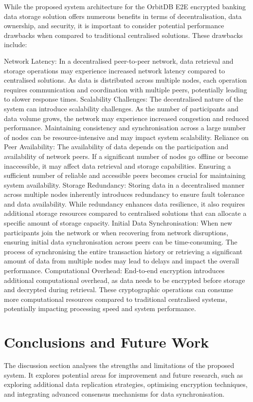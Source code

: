 \documentclass[a4paper,11 pt]{article}
\theoremstyle{definition}
\begin{document}
While the proposed system architecture for the OrbitDB E2E encrypted banking data storage solution offers numerous benefits in terms of decentralisation, data ownership, and security, it is important to consider potential performance drawbacks when compared to traditional centralised solutions. These drawbacks include:

Network Latency: In a decentralised peer-to-peer network, data retrieval and storage operations may experience increased network latency compared to centralised solutions. As data is distributed across multiple nodes, each operation requires communication and coordination with multiple peers, potentially leading to slower response times.
Scalability Challenges: The decentralised nature of the system can introduce scalability challenges. As the number of participants and data volume grows, the network may experience increased congestion and reduced performance. Maintaining consistency and synchronisation across a large number of nodes can be resource-intensive and may impact system scalability.
Reliance on Peer Availability: The availability of data depends on the participation and availability of network peers. If a significant number of nodes go offline or become inaccessible, it may affect data retrieval and storage capabilities. Ensuring a sufficient number of reliable and accessible peers becomes crucial for maintaining system availability.
Storage Redundancy: Storing data in a decentralised manner across multiple nodes inherently introduces redundancy to ensure fault tolerance and data availability. While redundancy enhances data resilience, it also requires additional storage resources compared to centralised solutions that can allocate a specific amount of storage capacity.
Initial Data Synchronisation: When new participants join the network or when recovering from network disruptions, ensuring initial data synchronisation across peers can be time-consuming. The process of synchronising the entire transaction history or retrieving a significant amount of data from multiple nodes may lead to delays and impact the overall performance.
Computational Overhead: End-to-end encryption introduces additional computational overhead, as data needs to be encrypted before storage and decrypted during retrieval. These cryptographic operations can consume more computational resources compared to traditional centralised systems, potentially impacting processing speed and system performance.

\section{Conclusions and Future Work}
The discussion section analyses the strengths and limitations of the proposed system. It explores potential areas for improvement and future research, such as exploring additional data replication strategies, optimising encryption techniques, and integrating advanced consensus mechanisms for data synchronisation.
\end{document}
